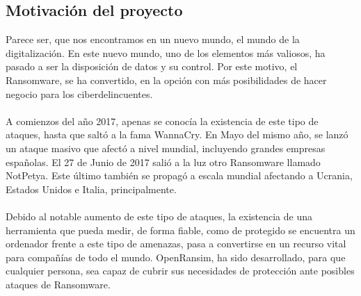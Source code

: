 \documentclass[a4paper,12pt]{article}
\begin{document}
\subsection{Motivación del proyecto}
Parece ser, que nos encontramos en un nuevo mundo, el mundo de la digitalización. En este nuevo mundo, uno de los elementos más valiosos, ha pasado a ser la disposición de datos y su control. Por este motivo, el Ransomware, se ha convertido, en la opción con más posibilidades de hacer negocio para los ciberdelincuentes.\\\\
A comienzos del año 2017, apenas se conocía la existencia de este tipo de ataques, hasta que saltó a la fama WannaCry\cite{wannacry}. En Mayo del mismo año, se lanzó un ataque masivo que afectó a nivel mundial, incluyendo grandes empresas españolas. El 27 de Junio de 2017 salió a la luz otro Ransomware llamado NotPetya. Este último también se propagó a escala mundial afectando a Ucrania, Estados Unidos e Italia, principalmente.\\\\
Debido al notable aumento de este tipo de ataques, la existencia de una herramienta que pueda medir, de forma fiable, como de protegido se encuentra un ordenador frente a este tipo de amenazas, pasa a convertirse en un recurso vital para compañías de todo el mundo. 
OpenRansim, ha sido desarrollado, para que cualquier persona, sea capaz de cubrir sus necesidades de protección ante posibles ataques de Ransomware. 
\end{document}
